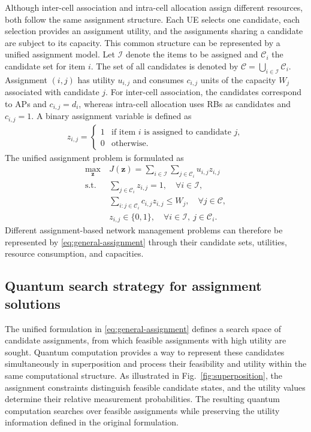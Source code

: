 \documentclass[journal]{IEEEtran}
\begin{document}
{{Although inter-cell association and intra-cell allocation assign different resources, both follow the same assignment structure. Each UE
selects one candidate, each selection provides an assignment utility, and the assignments sharing a candidate are subject to its capacity.
This common structure can be represented by a unified assignment model. Let $\mathcal{I}$ denote the items to be assigned and $\mathcal{C}_i$
the candidate set for item $i$. The set of all candidates is denoted by $\mathcal{C}=\bigcup_{i\in\mathcal{I}}\mathcal{C}_i$. Assignment
$(i,j)$ has utility $u_{i,j}$ and consumes $c_{i,j}$ units of the capacity $W_j$ associated with candidate $j$. For inter-cell
association, the candidates correspond to APs and $c_{i,j}=d_i$, whereas intra-cell allocation uses RBs as candidates and
$c_{i,j}=1$. A binary assignment variable is defined as
\begin{align}
z_{i,j}=
\begin{cases}
1 & \text{if item $i$ is assigned to candidate $j$},\\
0 & \text{otherwise}.
\end{cases}
\label{eq:general-assignment-variable}
\end{align}
The unified assignment problem is formulated as
\begin{align}
\max_{\bm z}~&
J(\bm z)
=\sum_{i\in\mathcal{I}}
\sum_{j\in\mathcal{C}_i}
u_{i,j}z_{i,j}
\nonumber\\
\mathrm{s.t.}~&
\sum_{j\in\mathcal{C}_i}z_{i,j}=1,
\quad \forall i\in\mathcal{I},
\nonumber\\
&\sum_{i:j\in\mathcal{C}_i}
c_{i,j}z_{i,j}\leq W_j,
\quad \forall j\in\mathcal{C},
\nonumber\\
&z_{i,j}\in\{0,1\},
\quad \forall i\in\mathcal{I},~j\in\mathcal{C}_i.
\label{eq:general-assignment}
\end{align}
Different assignment-based network management problems can therefore be represented by \eqref{eq:general-assignment} through their candidate
sets, utilities, resource consumption, and capacities.

\vspace{-3mm}
\subsection{Quantum search strategy for assignment solutions}
\label{sec:factorization}
The unified formulation in \eqref{eq:general-assignment} defines a search space of candidate assignments, from which feasible assignments with high utility are sought. Quantum computation provides a way to represent these candidates simultaneously in superposition and process their feasibility and utility within the same computational structure. As illustrated in Fig.~\ref{fig:superposition}, the assignment constraints distinguish feasible candidate states, and the utility values determine their relative measurement probabilities. The resulting quantum computation searches over feasible assignments while preserving the utility information defined in the original formulation.

}}
\end{document}
